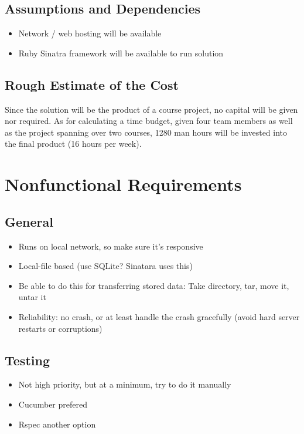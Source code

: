 \documentclass{article}
\begin{document}
\subsection{Assumptions and Dependencies}
\begin{itemize}
\item Network / web hosting will be available
\item Ruby Sinatra framework will be available to run solution
\end{itemize}

\subsection{Rough Estimate of the Cost}
Since the solution will be the product of a course project, no capital will be given nor required.  As for calculating a time budget, given four team members as well as the project spanning over two courses, 1280 man hours will be invested into the final product (16 hours per week).

\section{Nonfunctional Requirements}

\subsection{General}
\begin{itemize}
\item Runs on local network, so make sure it's responsive
\item Local-file based (use SQLite? Sinatara uses this)
\item Be able to do this for transferring stored data: Take directory, tar, move it, untar it
\item Reliability: no crash, or at least handle the crash gracefully (avoid hard server restarts or corruptions)
\end{itemize}

\subsection{Testing}
\begin{itemize}
\item Not high priority, but at a minimum, try to do it manually
\item Cucumber prefered
\item Rspec another option
\end{itemize}
\end{document}
